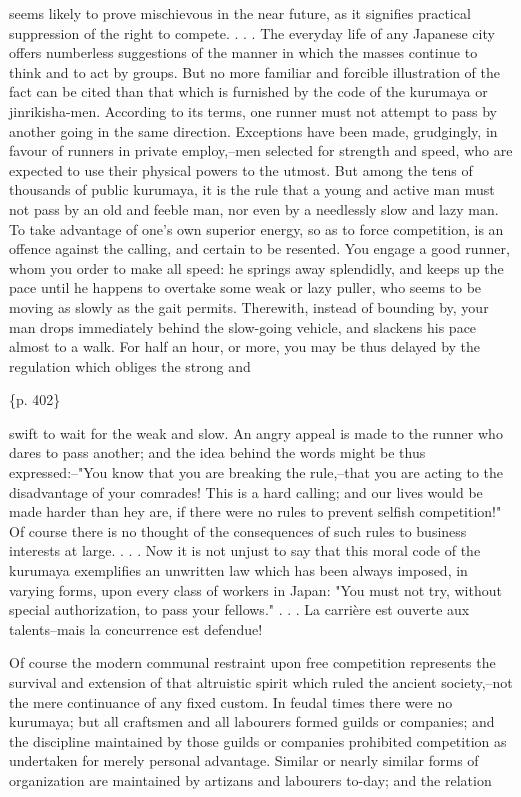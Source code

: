 seems likely to prove mischievous in the near future, as it signifies practical suppression of the right to compete. . . . The everyday life of any Japanese city offers numberless suggestions of the manner in which the masses continue to think and to act by groups. But no more familiar and forcible illustration of the fact can be cited than that which is furnished by the code of the kurumaya or jinrikisha-men. According to its terms, one runner must not attempt to pass by another going in the same direction. Exceptions have been made, grudgingly, in favour of runners in private employ,--men selected for strength and speed, who are expected to use their physical powers to the utmost. But among the tens of thousands of public kurumaya, it is the rule that a young and active man must not pass by an old and feeble man, nor even by a needlessly slow and lazy man. To take advantage of one's own superior energy, so as to force competition, is an offence against the calling, and certain to be resented. You engage a good runner, whom you order to make all speed: he springs away splendidly, and keeps up the pace until he happens to overtake some weak or lazy puller, who seems to be moving as slowly as the gait permits. Therewith, instead of bounding by, your man drops immediately behind the slow-going vehicle, and slackens his pace almost to a walk. For half an hour, or more, you may be thus delayed by the regulation which obliges the strong and

\{p. 402\}

swift to wait for the weak and slow. An angry appeal is made to the runner who dares to pass another; and the idea behind the words might be thus expressed:--"You know that you are breaking the rule,--that you are acting to the disadvantage of your comrades! This is a hard calling; and our lives would be made harder than hey are, if there were no rules to prevent selfish competition!" Of course there is no thought of the consequences of such rules to business interests at large. . . . Now it is not unjust to say that this moral code of the kurumaya exemplifies an unwritten law which has been always imposed, in varying forms, upon every class of workers in Japan: "You must not try, without special authorization, to pass your fellows." . . . La carrière est ouverte aux talents--mais la concurrence est defendue!



Of course the modern communal restraint upon free competition represents the survival and extension of that altruistic spirit which ruled the ancient society,--not the mere continuance of any fixed custom. In feudal times there were no kurumaya; but all craftsmen and all labourers formed guilds or companies; and the discipline maintained by those guilds or companies prohibited competition as undertaken for merely personal advantage. Similar or nearly similar forms of organization are maintained by artizans and labourers to-day; and the relation


